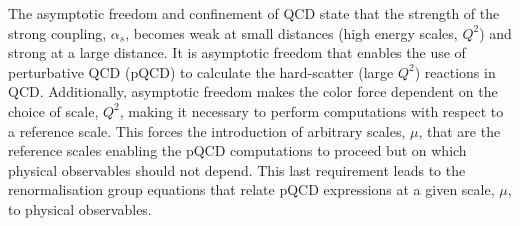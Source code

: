 The asymptotic freedom and confinement of QCD state that the strength of the strong coupling, $\alpha_s$, becomes weak at
small distances (high energy scales, $Q^2$) and strong at a large distance.
It is asymptotic freedom that enables the use of perturbative QCD (pQCD) to calculate the hard-scatter (large $Q^2$)
reactions in QCD. Additionally, asymptotic freedom makes the color force dependent on the choice of scale, $Q^2$,
making it necessary to perform computations with respect to a reference scale.
This forces the introduction of arbitrary scales, $\mu$, that are the reference scales enabling the pQCD computations
to proceed but on which physical observables should not depend.
This last requirement leads to the renormalisation group equations that relate pQCD expressions at a given
scale, $\mu$, to physical observables.


